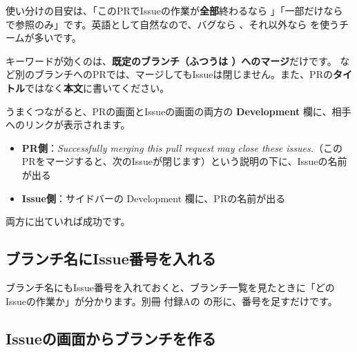 \medskip

使い分けの目安は、「このPRでIssueの作業が\textbf{全部}終わるなら 」「一部だけなら  で参照のみ」です。英語として自然なので、バグなら 、それ以外なら  を使うチームが多いです。

\begin{warnbox}
キーワードが効くのは、\textbf{既定のブランチ（ふつうは ）へのマージ}だけです。 など別のブランチへのPRでは、マージしてもIssueは閉じません。また、PRの\textbf{タイトル}ではなく\textbf{本文}に書いてください。
\end{warnbox}

うまくつながると、PRの画面とIssueの画面の両方の \textbf{Development} 欄に、相手へのリンクが表示されます。

\begin{itemize}[leftmargin=1.4em]
  \item \textbf{PR側}：\textit{Successfully merging this pull request may close these issues.}（このPRをマージすると、次のIssueが閉じます）という説明の下に、Issueの名前が出る
  \item \textbf{Issue側}：サイドバーの Development 欄に、PRの名前が出る
\end{itemize}

両方に出ていれば成功です。


\subsection{ブランチ名にIssue番号を入れる}

ブランチ名にもIssue番号を入れておくと、ブランチ一覧を見たときに「どのIssueの作業か」が分かります。別冊 付録Aの \textbf{} の形に、番号を足すだけです。

\begin{codebox}[bash]
\end{codebox}

\subsection{Issueの画面からブランチを作る}

